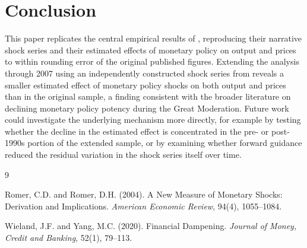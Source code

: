 \documentclass[11pt]{article}
\begin{document}
\section{Conclusion}

This paper replicates the central empirical results of \citet{romerromer2004}, reproducing their narrative shock series and their estimated effects of monetary policy on output and prices to within rounding error of the original published figures. Extending the analysis through 2007 using an independently constructed shock series from \citet{wielandyang2020} reveals a smaller estimated effect of monetary policy shocks on both output and prices than in the original sample, a finding consistent with the broader literature on declining monetary policy potency during the Great Moderation. Future work could investigate the underlying mechanism more directly, for example by testing whether the decline in the estimated effect is concentrated in the pre- or post-1990s portion of the extended sample, or by examining whether forward guidance reduced the residual variation in the shock series itself over time.

\begin{thebibliography}{9}

Romer, C.D. and Romer, D.H. (2004). A New Measure of Monetary Shocks: Derivation and Implications. \textit{American Economic Review}, 94(4), 1055--1084.

Wieland, J.F. and Yang, M.C. (2020). Financial Dampening. \textit{Journal of Money, Credit and Banking}, 52(1), 79--113.

\end{thebibliography}
\end{document}
